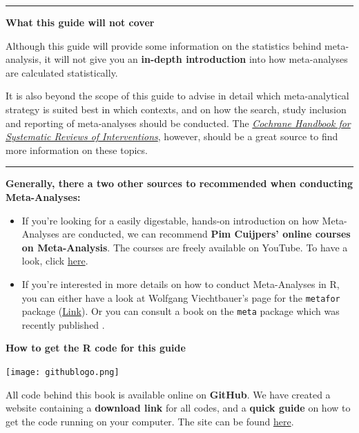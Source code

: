 \documentclass[]{book}
\providecommand{\tightlist}{%
  \setlength{\itemsep}{0pt}\setlength{\parskip}{0pt}}
\begin{document}
\begin{center}\rule{0.5\linewidth}{\linethickness}\end{center}

\textbf{What this guide will not cover}

Although this guide will provide some information on the statistics behind meta-analysis, it will not give you an \textbf{in-depth introduction} into how meta-analyses are calculated statistically.

It is also beyond the scope of this guide to advise in detail which meta-analytical strategy is suited best in which contexts, and on how the search, study inclusion and reporting of meta-analyses should be conducted. The \href{http://handbook-5-1.cochrane.org/}{\emph{Cochrane Handbook for Systematic Reviews of Interventions}}, however, should be a great source to find more information on these topics.

\begin{center}\rule{0.5\linewidth}{\linethickness}\end{center}

\textbf{Generally, there a two other sources to recommended when conducting Meta-Analyses:}

\begin{itemize}
\tightlist
\item
  If you're looking for a easily digestable, hands-on introduction on how Meta-Analyses are conducted, we can recommend \textbf{Pim Cuijpers' online courses on Meta-Analysis}. The courses are freely available on YouTube. To have a look, click \href{https://www.youtube.com/watch?v=pP7_VBrG_TY\&list=PL-h5cI5Bkvt0J-O0kq_9J9_aksWFPgR7s}{here}.
\item
  If you're interested in more details on how to conduct Meta-Analyses in R, you can either have a look at Wolfgang Viechtbauer's page for the \texttt{metafor} package (\href{http://metafor-project.org}{Link}). Or you can consult a book on the \texttt{meta} package which was recently published \citep{schwarzer2015meta}.
\end{itemize}

\begin{rmdinfo}
\textbf{How to get the R code for this guide}

\texttt{[image: githublogo.png]}

All code behind this book is available online on \textbf{GitHub}. We
have created a website containing a \textbf{download link} for all
codes, and a \textbf{quick guide} on how to get the code running on your
computer. The site can be found
\href{https://mathiasharrer.github.io/Doing-Meta-Analysis-in-R/}{here}.
\end{rmdinfo}
\end{document}
